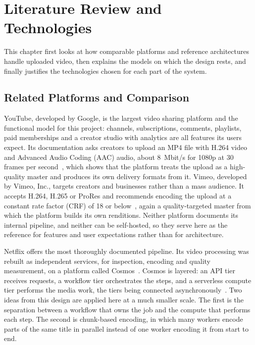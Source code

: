 \chapter{Literature Review and Technologies}
\label{chap:literature}

This chapter first looks at how comparable platforms and reference architectures handle uploaded
video, then explains the models on which the design rests, and finally justifies the technologies
chosen for each part of the system.

\section{Related Platforms and Comparison}
\label{sec:related-platforms}

YouTube, developed by Google, is the largest video sharing platform and the functional model for
this project: channels, subscriptions, comments, playlists, paid memberships and a creator studio
with analytics are all features its users expect. Its documentation asks creators to upload an MP4
file with H.264 video and Advanced Audio Coding (AAC) audio, about 8~Mbit/s for 1080p at 30 frames per
second~\cite{youtubeencoding}, which shows that the platform treats the upload as a high-quality
master and produces its own delivery formats from it. Vimeo, developed by Vimeo, Inc., targets
creators and businesses rather than a mass audience. It accepts H.264, H.265 or ProRes and
recommends encoding the upload at a constant rate factor (CRF) of 18 or below~\cite{vimeocompression},
again a quality-targeted master from which the platform builds its own renditions. Neither
platform documents its internal pipeline, and neither can be self-hosted, so they serve here as the
reference for features and user expectations rather than for architecture.

Netflix offers the most thoroughly documented pipeline. Its video processing was rebuilt as
independent services, for inspection, encoding and quality measurement, on a platform called
Cosmos~\cite{netflix2024microservices}. Cosmos is layered: an API tier receives requests, a workflow
tier orchestrates the steps, and a serverless compute tier performs the media work, the tiers being
connected asynchronously~\cite{netflix2021ves}. Two ideas from this design are applied here at a
much smaller scale. The first is the separation between a workflow that owns the job and the compute
that performs each step. The second is chunk-based encoding, in which many workers encode parts of
the same title in parallel instead of one worker encoding it from start to end.

